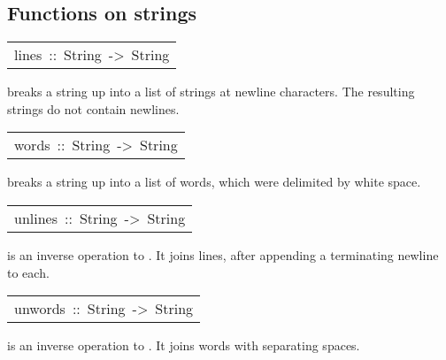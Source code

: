 \subsection{Functions on strings
}
\begin{haddockdesc}
\item[\begin{tabular}{@{}l}
lines\ ::\ String\ ->\ {\char 91}String{\char 93}
\end{tabular}]\haddockbegindoc
{} breaks a string up into a list of strings at newline
 characters.  The resulting strings do not contain newlines.
\par

\end{haddockdesc}
\begin{haddockdesc}
\item[\begin{tabular}{@{}l}
words\ ::\ String\ ->\ {\char 91}String{\char 93}
\end{tabular}]\haddockbegindoc
{} breaks a string up into a list of words, which were delimited
 by white space.
\par

\end{haddockdesc}
\begin{haddockdesc}
\item[\begin{tabular}{@{}l}
unlines\ ::\ {\char 91}String{\char 93}\ ->\ String
\end{tabular}]\haddockbegindoc
{} is an inverse operation to .
 It joins lines, after appending a terminating newline to each.
\par

\end{haddockdesc}
\begin{haddockdesc}
\item[\begin{tabular}{@{}l}
unwords\ ::\ {\char 91}String{\char 93}\ ->\ String
\end{tabular}]\haddockbegindoc
{} is an inverse operation to .
 It joins words with separating spaces.
\par

\end{haddockdesc}
